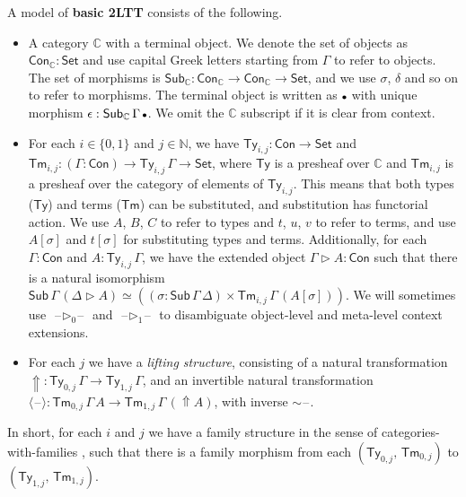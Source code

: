 \documentclass[acmsmall]{acmart}
\newcommand{\msf}[1]{\mathsf{#1}}
\newcommand{\mbb}[1]{\mathbb{#1}}
\newcommand{\ext}{\triangleright}
\newcommand{\Lift}{{\Uparrow}}
\newcommand{\spl}{{\sim}}
\newcommand{\qut}[1]{\langle #1\rangle}
\newcommand{\mbbc}{\mbb{C}}
\newcommand{\Con}{\msf{Con}}
\newcommand{\Sub}{\msf{Sub}}
\newcommand{\Ty}{\msf{Ty}}
\newcommand{\Tm}{\msf{Tm}}
\newcommand{\emptycon}{\scaleobj{.75}\bullet}
\newcommand{\Set}{\mathsf{Set}}
\newcommand{\blank}{{\mathord{\hspace{1pt}\text{--}\hspace{1pt}}}}
\theoremstyle{remark}
\begin{document}
\begin{definition} A model of \textbf{basic 2LTT} consists of the following.
\begin{itemize}
\item
  A category $\mbbc$ with a terminal object. We denote the set of objects as
  $\Con_{\mbbc} : \Set$ and use capital Greek letters starting from $\Gamma$ to
  refer to objects. The set of morphisms is $\Sub_{\mbbc} : \Con_{\mbbc} \to
  \Con_{\mbbc} \to \Set$, and we use $\sigma$, $\delta$ and so on to refer to
  morphisms. The terminal object is written as $\emptycon$ with unique morphism
  $\epsilon : \Sub_\mbbc\,\Gamma\,\emptycon$. We omit the $\mbbc$ subscript if
  it is clear from context.
\item
  For each $i \in \{0,1\}$ and $j \in \mbb{N}$, we have $\Ty_{i,j} : \Con
  \to \Set$ and $\Tm_{i,j} : (\Gamma : \Con) \to \Ty_{i,j}\,\Gamma \to \Set$,
  where $\Ty$ is a presheaf over $\mbbc$ and $\Tm_{i,j}$ is a presheaf over the
  category of elements of $\Ty_{i,j}$. This means that both types ($\Ty$) and
  terms ($\Tm$) can be substituted, and substitution has functorial action. We
  use $A$, $B$, $C$ to refer to types and $t$, $u$, $v$ to refer to terms, and
  use $A[\sigma]$ and $t[\sigma]$ for substituting types and
  terms. Additionally, for each $\Gamma : \Con$ and $A : \Ty_{i,j}\,\Gamma$, we
  have the extended object $\Gamma \ext A : \Con$ such that there is a natural
  isomorphism $\Sub\,\Gamma\,(\Delta\ext A) \simeq ((\sigma :
  \Sub\,\Gamma\,\Delta) \times \Tm_{i,j}\,\Gamma\,(A[\sigma]))$. We will sometimes
  use $\blank\!\ext_0\!\blank$ and $\blank\!\ext_1\!\blank$ to disambiguate object-level
  and meta-level context extensions.
\item
  For each $j$ we have a \emph{lifting structure}, consisting of a natural
  transformation $\Lift : \Ty_{0,j}\,\Gamma \to \Ty_{1,j}\,\Gamma$, and an
  invertible natural transformation $\qut{\blank} : \Tm_{0,j}\,\Gamma\,A \to
  \Tm_{1,j}\,\Gamma\,(\Lift A)$, with inverse $\spl\blank$.
\end{itemize}
\end{definition}

In short, for each $i$ and $j$ we have a family structure in the sense of
categories-with-families \cite{Dybjer96internaltype}, such that there is a
family morphism from each $(\Ty_{0,j},\,\Tm_{0,j})$ to $(\Ty_{1,j},\,\Tm_{1,j})$.
\end{document}
